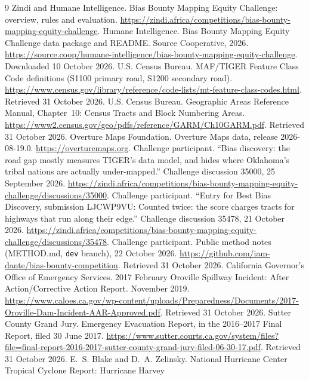 \documentclass[10pt,twocolumn,a4paper]{article}
\begin{document}
\begin{thebibliography}{9}\small\setlength{\itemsep}{1pt}
 Zindi and Humane Intelligence. Bias Bounty Mapping Equity Challenge: overview, rules and evaluation.
\url{https://zindi.africa/competitions/bias-bounty-mapping-equity-challenge}.
 Humane Intelligence. Bias Bounty Mapping Equity Challenge data package and README. Source Cooperative,
2026. \url{https://source.coop/humane-intelligence/bias-bounty-mapping-equity-challenge}. Downloaded 10 October 2026.
 U.S. Census Bureau. MAF/TIGER Feature Class Code definitions (S1100 primary road, S1200 secondary road).
\url{https://www.census.gov/library/reference/code-lists/mt-feature-class-codes.html}. Retrieved 31 October 2026.
 U.S. Census Bureau. Geographic Areas Reference Manual, Chapter~10: Census Tracts and Block Numbering
Areas. \url{https://www2.census.gov/geo/pdfs/reference/GARM/Ch10GARM.pdf}. Retrieved 31 October 2026.
 Overture Maps Foundation. Overture Maps data, release 2026-08-19.0. \url{https://overturemaps.org}.
 Challenge participant. ``Bias discovery: the road gap mostly measures TIGER's data model, and hides where
Oklahoma's tribal nations are actually under-mapped.'' Challenge discussion 35000, 25 September 2026.
\url{https://zindi.africa/competitions/bias-bounty-mapping-equity-challenge/discussions/35000}.
 Challenge participant. ``Entry for Best Bias Discovery, submission LJCWP9VU: Counted twice: the score
charges tracts for highways that run along their edge.'' Challenge discussion 35478, 21 October 2026.
\url{https://zindi.africa/competitions/bias-bounty-mapping-equity-challenge/discussions/35478}.
 Challenge participant. Public method notes (METHOD.md, \texttt{dev} branch), 22 October 2026.
\url{https://github.com/iam-dante/bias-bounty-competition}. Retrieved 31 October 2026.
 California Governor's Office of Emergency Services. 2017 February Oroville Spillway Incident: After
Action/Corrective Action Report. November 2019.
\url{https://www.caloes.ca.gov/wp-content/uploads/Preparedness/Documents/2017-Oroville-Dam-Incident-AAR-Approved.pdf}.
Retrieved 31 October 2026.
 Sutter County Grand Jury. Emergency Evacuation Report, in the 2016--2017 Final Report, filed 30 June
2017. \url{https://www.sutter.courts.ca.gov/system/files?file=final-report-2016-2017-sutter-county-grand-jury-filed-06-30-17.pdf}.
Retrieved 31 October 2026.
 E.~S. Blake and D.~A. Zelinsky. National Hurricane Center Tropical Cyclone Report: Hurricane Harvey

\end{thebibliography}
\end{document}
